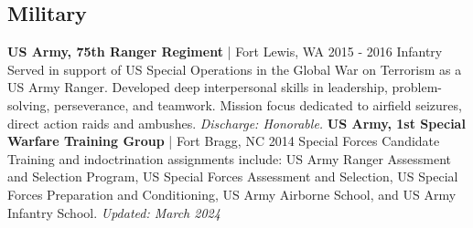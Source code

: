 \documentclass{article}
\begin{document}
\begin{bgbox}[
        height = \paperheight,
        width = 0.69\textwidth,
        colback = white
    ]
{            \section*{Military}
                \textbf{US Army, 75th Ranger Regiment} | Fort Lewis, WA \hfill{2015 - 2016}\newline
                        Infantry\newline\newline
                            Served in support of US Special Operations in the Global War on Terrorism as a US Army Ranger. Developed deep interpersonal skills in leadership, problem-solving, perseverance, and teamwork. Mission focus dedicated to airfield seizures, direct action raids and ambushes. \textit{Discharge: Honorable.}\newline\newline
                \textbf{US Army, 1st Special Warfare Training Group} | Fort Bragg, NC \hfill{2014}\newline
                        Special Forces Candidate\newline\newline
                            Training and indoctrination assignments include: US Army Ranger Assessment and Selection Program, US Special Forces Assessment and Selection, US Special Forces Preparation and Conditioning, US Army Airborne School, and US Army Infantry School.\newline
            \mbox{}
            \vfill
            \hfill{}\textit{Updated: March 2024}
        }
    \end{bgbox}
\end{document}
